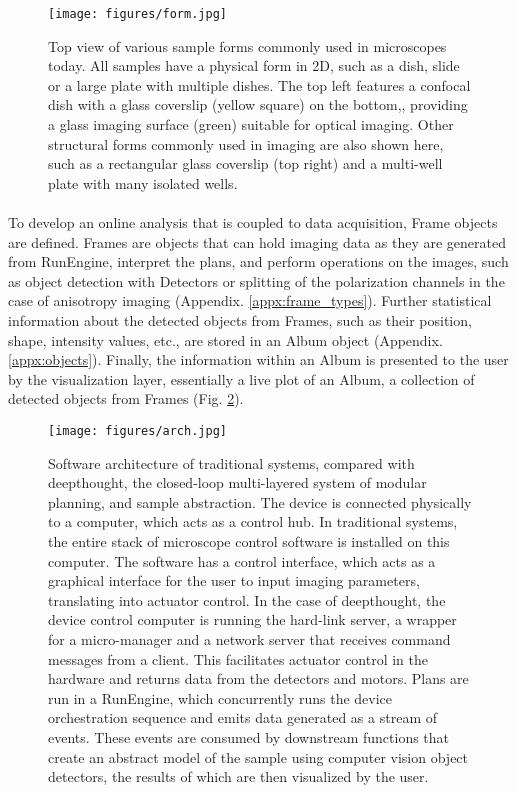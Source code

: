 \begin{figure}[H]
    {\hfill\texttt{[image: figures/form.jpg]}\hspace*{\fill}}
    \caption{Top view of various sample forms commonly used in microscopes today. All samples have a physical form in 2D, such as a dish, slide or a large plate with multiple dishes. The top left features a confocal dish with a glass coverslip (yellow square) on the bottom,, providing a glass imaging surface (green) suitable for optical imaging. Other structural forms commonly used in imaging are also shown here, such as a rectangular glass coverslip (top right) and a multi-well plate with many isolated wells.}
    {\label{fig:form}}
\end{figure}


\paragraph*{} To develop an online analysis that is coupled to data acquisition, Frame objects are defined. Frames are objects that can hold imaging data as they are generated from RunEngine, interpret the plans, and perform operations on the images, such as object detection with Detectors or splitting of the polarization channels in the case of anisotropy imaging (Appendix. \ref{appx:frame_types}). Further statistical information about the detected objects from Frames, such as their position, shape, intensity values, etc., are stored in an Album object (Appendix. \ref{appx:objects}). Finally, the information within an Album is presented to the user by the visualization layer, essentially a live plot of an Album, a collection of detected objects from Frames (Fig. \ref{fig:arch}).

\begin{figure}[h]
    {\hfill\texttt{[image: figures/arch.jpg]}\hspace*{\fill}}
    \caption{Software architecture of traditional systems, compared with deepthought, the closed-loop multi-layered system of modular planning, and sample abstraction. The device is connected physically to a computer, which acts as a control hub. In traditional systems, the entire stack of microscope control software is installed on this computer. The software has a control interface, which acts as a graphical interface for the user to input imaging parameters, translating into actuator control. In the case of deepthought, the device control computer is running the hard-link server, a wrapper for a micro-manager and a network server that receives command messages from a client. This facilitates actuator control in the hardware and returns data from the detectors and motors. Plans are run in a RunEngine, which concurrently runs the device orchestration sequence and emits data generated as a stream of events. These events are consumed by downstream functions that create an abstract model of the sample using computer vision object detectors, the results of which are then visualized by the user.}
    {\label{fig:arch}}
\end{figure}


